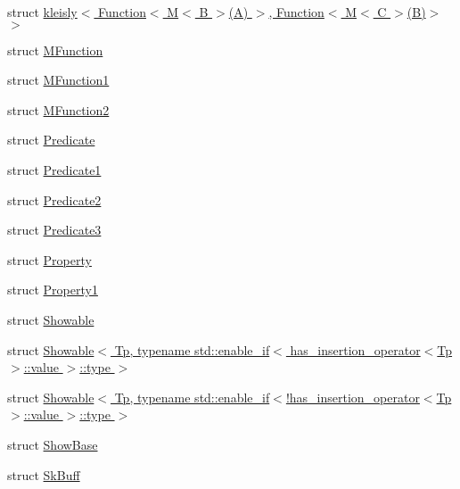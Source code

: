 \begin{DoxyCompactItemize}
\item 
struct \hyperlink{structpfq__lang_1_1kleisly_3_01Function_3_01M_3_01B_01_4_07A_08_01_4_00_01Function_3_01M_3_01C_01_4_07B_08_4_01_4}{kleisly$<$ Function$<$ M$<$ B $>$(\+A) $>$, Function$<$ M$<$ C $>$(\+B)$>$ $>$}
\item 
struct \hyperlink{structpfq__lang_1_1MFunction}{M\+Function}
\item 
struct \hyperlink{structpfq__lang_1_1MFunction1}{M\+Function1}
\item 
struct \hyperlink{structpfq__lang_1_1MFunction2}{M\+Function2}
\item 
struct \hyperlink{structpfq__lang_1_1Predicate}{Predicate}
\item 
struct \hyperlink{structpfq__lang_1_1Predicate1}{Predicate1}
\item 
struct \hyperlink{structpfq__lang_1_1Predicate2}{Predicate2}
\item 
struct \hyperlink{structpfq__lang_1_1Predicate3}{Predicate3}
\item 
struct \hyperlink{structpfq__lang_1_1Property}{Property}
\item 
struct \hyperlink{structpfq__lang_1_1Property1}{Property1}
\item 
struct \hyperlink{structpfq__lang_1_1Showable}{Showable}
\item 
struct \hyperlink{structpfq__lang_1_1Showable_3_01Tp_00_01typename_01std_1_1enable__if_3_01has__insertion__operato0cfb72d444f463b2d87a78275e86feaa}{Showable$<$ Tp, typename std\+::enable\+\_\+if$<$ has\+\_\+insertion\+\_\+operator$<$\+Tp $>$\+::value $>$\+::type $>$}
\item 
struct \hyperlink{structpfq__lang_1_1Showable_3_01Tp_00_01typename_01std_1_1enable__if_3_9has__insertion__operator488b85264b5317ebf7312bb7e4c18409}{Showable$<$ Tp, typename std\+::enable\+\_\+if$<$!has\+\_\+insertion\+\_\+operator$<$\+Tp $>$\+::value $>$\+::type $>$}
\item 
struct \hyperlink{structpfq__lang_1_1ShowBase}{Show\+Base}
\item 
struct \hyperlink{structpfq__lang_1_1SkBuff}{Sk\+Buff}
\end{DoxyCompactItemize}
